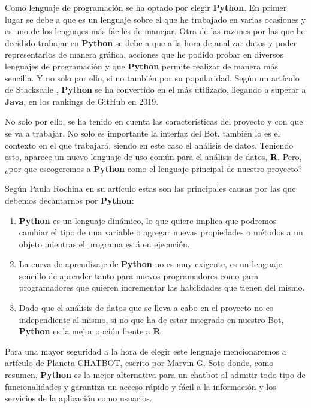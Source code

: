 Como lenguaje de programación se ha optado por elegir \textbf{Python}. En primer lugar se debe a que es un lenguaje sobre el que he trabajado en varias ocasiones y es uno de los lenguajes más fáciles de manejar. Otra de las razones por las que he decidido trabajar en \textbf{Python} se debe a que a la hora de analizar datos y poder representarlos de manera gráfica, acciones que he podido probar en diversos lenguajes de programación y que \textbf{Python} permite realizar de manera más sencilla. Y no solo por ello, si no también por su popularidad. Según un artículo de Stackscale \cite{articulo-stackscale}, \textbf{Python} se ha convertido en el más utilizado, llegando a superar a \textbf{Java}, en los rankings de GitHub en 2019.

No solo por ello, se ha tenido en cuenta las características del proyecto y con que se va a trabajar. No solo es importante la interfaz del Bot, también lo es el contexto en el que trabajará, siendo en este caso el análisis de datos. Teniendo esto, aparece un nuevo lenguaje de uso común para el análisis de datos, \textbf{R}. Pero, ¿por que escogeremos a \textbf{Python} como el lenguaje principal de nuestro proyecto?

Según Paula Rochina en su artículo \cite{articulo-revista-digital} estas son las principales causas por las que debemos decantarnos por \textbf{Python}:

\begin{enumerate}
	\item \textbf{Python} es un lenguaje dinámico, lo que quiere implica que podremos cambiar el tipo de una variable o agregar nuevas propiedades o métodos a un objeto mientras el programa está en ejecución.
	\item La curva de aprendizaje de \textbf{Python} no es muy exigente, es un lenguaje sencillo de aprender tanto para nuevos programadores como para programadores que quieren incrementar las habilidades que tienen del mismo.
	\item Dado que el análisis de datos que se lleva a cabo en el proyecto no es independiente al mismo, si no que ha de estar integrado en nuestro Bot, \textbf{Python} es la mejor opción frente a \textbf{R}
\end{enumerate}

Para una mayor seguridad a la hora de elegir este lenguaje mencionaremos a artículo de Planeta CHATBOT, escrito por Marvin G. Soto \cite{articulo-planeta-chatbot} donde, como resumen, \textbf{Python} es la mejor alternativa para un chatbot al admitir todo tipo de funcionalidades y garantiza un acceso rápido y fácil a la información y los servicios de la aplicación como usuarios.

